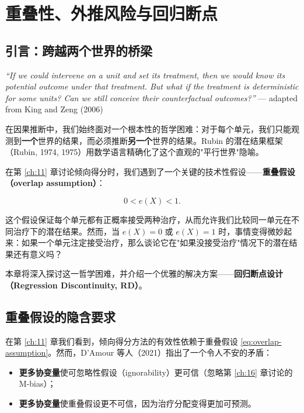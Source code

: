 
\chapter{重叠性、外推风险与回归断点}\label{ch:20}

\section{引言：跨越两个世界的桥梁}\label{sec:20-intro}

\textit{``If we could intervene on a unit and set its treatment, then we would know its potential outcome under that treatment. But what if the treatment is deterministic for some units? Can we still conceive their counterfactual outcomes?''}
--- adapted from King and Zeng (2006)

在因果推断中，我们始终面对一个根本性的哲学困难：对于每个单元，我们只能观测到\textbf{一个}世界的结果，而必须推断\textbf{另一个}世界的结果。Rubin 的潜在结果框架（Rubin, 1974, 1975）用数学语言精确化了这个直观的"平行世界"隐喻。

在第 \ref{ch:11} 章讨论倾向得分时，我们遇到了一个关键的技术性假设——\textbf{重叠假设（overlap assumption）}：

\begin{equation}
0 < e(X) < 1 .
\tag{20.1}
\label{eq:overlap-assumption}
\end{equation}

这个假设保证每个单元都有正概率接受两种治疗，从而允许我们比较同一单元在不同治疗下的潜在结果。然而，当 $e(X) = 0$ 或 $e(X) = 1$ 时，事情变得微妙起来：如果一个单元注定接受治疗，那么谈论它在"如果没接受治疗"情况下的潜在结果还有意义吗？

本章将深入探讨这一哲学困难，并介绍一个优雅的解决方案——\textbf{回归断点设计（Regression Discontinuity, RD）}。

\section{重叠假设的隐含要求}\label{sec:20-overlap-implications}

在第 \ref{ch:11} 章我们看到，倾向得分方法的有效性依赖于重叠假设 \cref{eq:overlap-assumption}。然而，D'Amour 等人（2021）指出了一个令人不安的矛盾：

\begin{itemize}
  \item \textbf{更多协变量}使可忽略性假设（ignorability）更可信（忽略第 \ref{ch:16} 章讨论的 M-bias）；
  \item \textbf{更多协变量}使重叠假设更不可信，因为治疗分配变得更加可预测。
\end{itemize}

